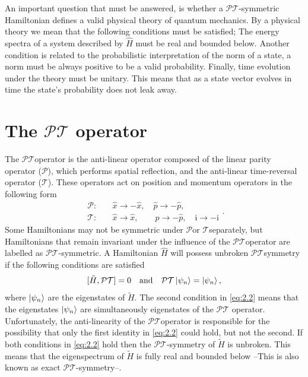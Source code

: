 \documentclass[12pt, a4paper]{report}
\newcommand\PT{\(\mathcal{PT}\)}
\newcommand\PP{\(\mathcal{P}\)}
\newcommand\TT{\(\mathcal{T}\)}
\begin{document}
An important question that must be answered, is whether a \PT-symmetric Hamiltonian defines a valid physical theory of quantum mechanics. By a physical theory we mean that the following conditions must be satisfied; The energy spectra of a system described by $\hat{H}$ must be real and bounded below. Another condition is related to the probabilistic interpretation of the norm of a state, a norm must be always positive to be a valid probability. Finally, time evolution under the theory must be unitary. This means that as a state vector evolves in time the state's probability does not leak away\cite{MustaHbeHermitian}\cite{MakingSense}.

\section{The \texorpdfstring{$\mathcal{PT}$}\: operator}
The \PT\:operator is the anti-linear operator composed of the linear parity operator (\PP), which performs spatial reflection, and the anti-linear time-reversal operator (\TT). These operators act on position and momentum operators in the following form
\begin{equation}\label{eq:2.1}
\begin{split}
\mathcal{P}:& \quad\hat{x} \rightarrow -\hat{x},\quad \hat{p} \rightarrow -\hat{p},\\
\mathcal{T}:& \quad\hat{x} \rightarrow \hat{x},\quad\quad \hat{p} \rightarrow -\hat{p},\quad \mathrm{i} \rightarrow -\mathrm{i}
\end{split}.
\end{equation}
Some Hamiltonians may not be symmetric under \PP\:or \TT\:separately, but Hamiltonians that remain invariant under the influence of the \PT\:operator are labelled as \PT-symmetric. 
A Hamiltonian $\hat{H}$ will possess unbroken \PT\:symmetry if the following conditions are satisfied
\begin{equation}\label{eq:2.2}
[\tilde{H}, \mathcal{PT}] = 0\quad\mathrm{and}\quad\mathcal{PT}\ket{\psi_n} = \ket{\psi_n},
\end{equation}
where $\ket{\psi_n}$ are the eigenstates of $\tilde{H}$. The second condition in \ref{eq:2.2} means that the eigenstates $\ket{\psi_n}$ are simultaneously eigenstates of the \PT\: operator. Unfortunately, the anti-linearity of the \PT\:operator is responsible for the possibility that only the first identity in \ref{eq:2.2} could hold, but not the second\cite{Faria1}.
If both conditions in \ref{eq:2.2} hold then the \PT-symmetry of $\tilde{H}$ is unbroken. This means that the eigenspectrum of $\tilde{H}$ is fully real and bounded below --This is also known as exact \PT-symmetry--.
\end{document}
